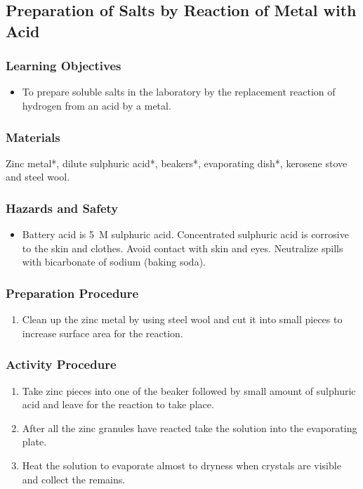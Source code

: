 \subsection{Preparation of Salts by Reaction of Metal with Acid}

\subsubsection*{Learning Objectives}
\begin{itemize}
\item{To prepare soluble salts in the laboratory by the replacement reaction of hydrogen from an acid by a metal.}
\end{itemize}

\subsubsection*{Materials}
Zinc metal*, dilute sulphuric acid*, beakers*, evaporating dish*, kerosene stove and steel wool.

\subsubsection*{Hazards and Safety}
\begin{itemize}
\item{Battery acid is 5~M sulphuric acid. Concentrated sulphuric acid is corrosive to the skin and clothes. Avoid contact with skin and eyes. Neutralize spills with bicarbonate of sodium (baking soda).}
\end{itemize}

\subsubsection*{Preparation Procedure}
\begin{enumerate}
\item{Clean up the zinc metal by using steel wool and cut it into small pieces to increase surface area for the reaction.}
\end{enumerate}

\subsubsection*{Activity Procedure}
\begin{enumerate}
\item{Take zinc pieces into one of the beaker followed by small amount of sulphuric acid and leave for the reaction to take place.}
\item{After all the zinc granules have reacted take the solution into the evaporating plate.}
\item{Heat the solution to evaporate almost to dryness when crystals are visible and collect the remains.}
\end{enumerate}

